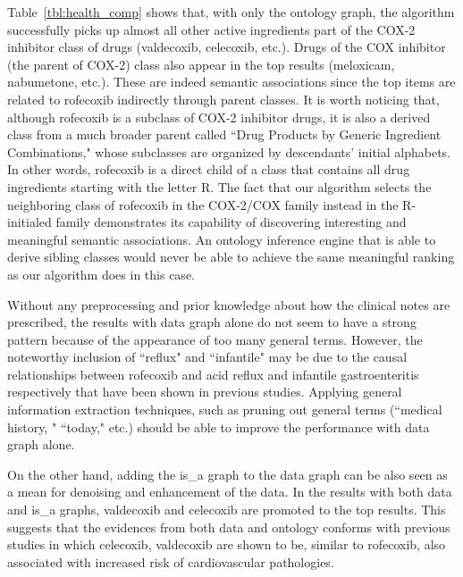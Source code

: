 Table~\ref{tbl:health_comp} shows that, with only the ontology graph, the algorithm successfully picks up almost all other active ingredients part of the COX-2 inhibitor class of drugs (valdecoxib, celecoxib, etc.). Drugs of the COX inhibitor (the parent of COX-2) class also appear in the top results (meloxicam, nabumetone, etc.). These are indeed semantic associations since the top items are related to rofecoxib indirectly through parent classes. It is worth noticing that, although rofecoxib is a subclass of COX-2 inhibitor drugs, it is also a derived class from a much broader parent called ``Drug Products by Generic Ingredient Combinations," whose subclasses are organized by descendants' initial alphabets. In other words, rofecoxib is a direct child of a class that contains all drug ingredients starting with the letter R. The fact that our algorithm selects the neighboring class of rofecoxib in the COX-2/COX family instead in the R-initialed family demonstrates its capability of discovering interesting and meaningful semantic associations. An ontology inference engine that is able to derive sibling classes would never be able to achieve the same meaningful ranking as our algorithm does in this case.

Without any preprocessing and prior knowledge about how the clinical notes are prescribed, the results with data graph alone do not seem to have a strong pattern because of the appearance of too many general terms. However, the noteworthy inclusion of ``reflux" and ``infantile" may be due to the causal relationships between rofecoxib and acid reflux and infantile gastroenteritis respectively that have been shown in previous studies. Applying general information extraction techniques, such as pruning out general terms (``medical history, " ``today," etc.) should be able to improve the performance with data graph alone.

On the other hand, adding the is\_a graph to the data graph can be also seen as a mean for denoising and enhancement of the data. In the results with both data and is\_a graphs, valdecoxib and celecoxib are promoted to the top results. This suggests that the evidences from both data and ontology conforms with previous studies in which celecoxib, valdecoxib are shown to be, similar to rofecoxib, also associated with increased risk of cardiovascular pathologies.

